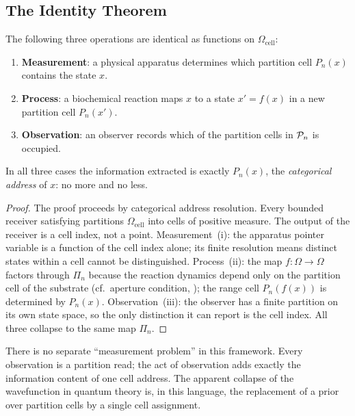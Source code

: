 \subsection{The Identity Theorem}

\begin{theorem}
\label{thm:mpi}
The following three operations are identical as functions on $\Omega_\mathrm{cell}$:
\begin{enumerate}[label=(\roman*)]
    \item \textbf{Measurement}: a physical apparatus determines which partition
          cell $P_n(x)$ contains the state $x$.
    \item \textbf{Process}: a biochemical reaction maps $x$ to a state
          $x'=f(x)$ in a new partition cell $P_n(x')$.
    \item \textbf{Observation}: an observer records which of the partition cells
          in $\mathcal{P}_n$ is occupied.
\end{enumerate}
In all three cases the information extracted is exactly $P_n(x)$, the
\emph{categorical address} of $x$: no more and no less.
\end{theorem}

\begin{proof}
The proof proceeds by categorical address resolution.  Every bounded receiver
satisfying  partitions $\Omega_\mathrm{cell}$
into cells of positive measure.  The output of the receiver is a cell index,
not a point.
Measurement~(i): the apparatus pointer variable is a function of the cell index
alone; its finite resolution means distinct states within a cell cannot be
distinguished.
Process~(ii): the map $f:\Omega\to\Omega$ factors through $\Pi_n$ because the
reaction dynamics depend only on the partition cell of the substrate (cf.\
aperture condition, ); the range cell $P_n(f(x))$ is
determined by $P_n(x)$.
Observation~(iii): the observer has a finite partition on its own state space,
so the only distinction it can report is the cell index.  All three collapse
to the same map $\Pi_n$.
\end{proof}

\begin{corollary}
\label{cor:no-measurement-problem}
There is no separate ``measurement problem'' in this framework.  Every
observation is a partition read; the act of observation adds exactly the
information content of one cell address.  The apparent collapse of the
wavefunction in quantum theory is, in this language, the replacement of a
prior over partition cells by a single cell assignment.
\end{corollary}

